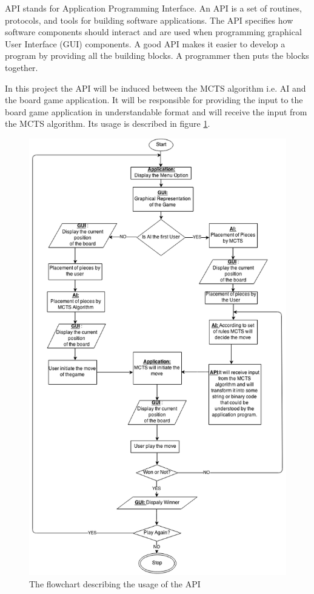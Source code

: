 API stands for Application Programming Interface. An API is a set of routines, protocols, and tools for building software applications. The API specifies how software components should interact and are used when programming graphical User Interface (GUI) components. A good API makes it easier to develop a program by providing all the building blocks. A programmer then puts the blocks together.

In this project the API will be induced between the MCTS algorithm i.e. AI and the board game application. It will be responsible for providing the input to the board game application in understandable format and will receive the input from the MCTS algorithm. Its usage is described in figure \ref{fig:flowchart}.
\bigbreak

\begin{figure}[H]
	\centering
	\includegraphics[width=\textwidth]{2General_Architecture/2.2API/img/DiagramAPI.png}
	\caption{The flowchart describing the usage of the API}
	\label{fig:flowchart}
\end{figure}


